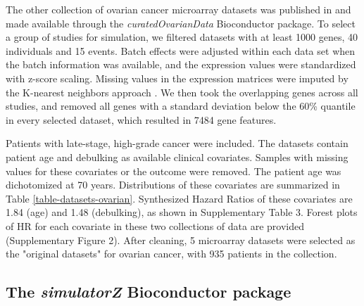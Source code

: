 \documentclass{bioinfo}
\begin{document}
  The other collection of ovarian cancer microarray datasets was published in
  \citet{Ganzfried2013} and made available through the \emph{curatedOvarianData} 
  Bioconductor package. To select a group of studies for simulation, 
  we filtered datasets with at least 1000 genes, 40 individuals and 15 events. Batch effects were
  adjusted within each data set when the batch information was available, 
  and the expression values were standardized with z-score scaling.
  Missing values in the expression matrices 
  were imputed by the K-nearest neighbors approach \citep{KNN}. We then took the overlapping
  genes across all studies, and removed all genes with a standard deviation below 
  the 60\% quantile in every selected dataset, which resulted in 7484 gene features.
 
  Patients with late-stage, high-grade cancer were included. 
  The datasets contain patient age and debulking as available 
  clinical covariates. Samples with missing values for these covariates or the outcome were removed. The patient age was dichotomized at 70 years. Distributions 
  of these covariates are summarized in Table \ref{table-datasets-ovarian}. Synthesized Hazard Ratios 
  of these covariates are 1.84 (age) and 1.48 (debulking), 
  as shown in Supplementary Table 3. Forest plots of HR for 
  each covariate in these two collections of data
  are provided (Supplementary Figure 2). After cleaning, 5 microarray datasets were selected as the "original datasets" for ovarian cancer, with 935 patients in the collection.
  

  \subsection{The \emph{simulatorZ} Bioconductor package}
 
\end{document}
